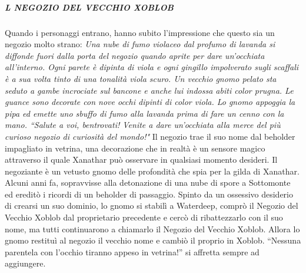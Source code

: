 \documentclass{article}
\begin{document}
\subparagraph{L NEGOZIO DEL VECCHIO XOBLOB} Quando i personaggi entrano, hanno subito l'impressione che questo sia un negozio molto strano:\newline
\textit{Una nube di fumo violaceo dal profumo di lavanda si diffonde fuori dalla porta del negozio quando aprite per dare un'occhiata all'interno. Ogni parete è dipinta di viola e ogni gingillo impolverato sugli scaffali è a sua volta tinto di una tonalità viola scuro. Un vecchio gnomo pelato sta seduto a gambe incrociate sul bancone e anche lui indossa abiti color prugna. Le guance sono decorate con nove occhi dipinti di color viola. 
Lo gnomo appoggia la pipa ed emette uno sbuffo di fumo alla lavanda prima di fare un cenno con la mano. 
“Salute a voi, bentrovati! Venite a dare un'occhiata alla merce del più curioso negozio di curiosità del mondo!"}\newline
Il negozio trae il suo nome dal beholder impagliato in vetrina, una decorazione che in realtà è un sensore magico attraverso il quale Xanathar può osservare in qualsiasi momento desideri. 
Il negoziante è un vetusto gnomo delle profondità che spia per la gilda di Xanathar. Alcuni anni fa, sopravvisse alla detonazione di una nube di spore a Sottomonte ed ereditò i ricordi di un beholder di passaggio. Spinto da un ossessivo desiderio di crearsi un suo dominio, lo gnomo si stabilì a Waterdeep, comprò il Negozio del Vecchio Xoblob dal proprietario precedente e cercò di ribattezzarlo con il suo nome, ma tutti continuarono a chiamarlo il Negozio del Vecchio Xoblob. Allora lo gnomo restituì al negozio il vecchio nome e cambiò il proprio in Xoblob. “Nessuna parentela con l'occhio tiranno appeso in vetrina!” si affretta sempre ad aggiungere.\newline
\end{document}
